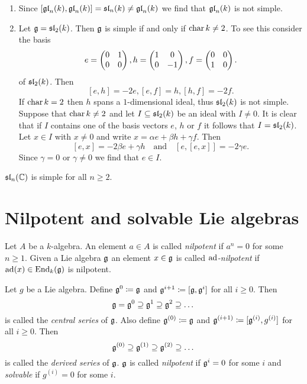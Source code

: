 \begin{expls}
 \begin{enumerate}
  \item
   Since $[\mathfrak{gl}_n(k),\mathfrak{gl}_n(k)] = \mathfrak{sl}_n(k) \neq \mathfrak{gl}_n(k)$ we find that $\mathfrak{gl}_n(k)$ is not simple.
  \item
   Let $\mathfrak{g} = \mathfrak{sl}_2(k)$. Then $\mathfrak{g}$ is simple if and only if $\operatorname{char} k \neq 2$. To see this consider the basis
   \[
    e = \begin{pmatrix}0 & 1 \\ 0 & 0\end{pmatrix}, h = \begin{pmatrix}1 & 0 \\ 0 & -1\end{pmatrix}, f = \begin{pmatrix}0 & 0 \\ 1 & 0\end{pmatrix}.
   \]
   of $\mathfrak{sl}_2(k)$. Then
   \[
    [e,h] = -2e, [e,f] = h, [h,f] = -2f.
   \]
   If $\operatorname{char} k = 2$ then $h$ spans a $1$-dimensional ideal, thus $\mathfrak{sl}_2(k)$ is not simple. Suppose that $\operatorname{char} k \neq 2$ and let $I \subseteq \mathfrak{sl}_2(k)$ be an ideal with $I \neq 0$. It is clear that if $I$ contains one of the basis vectors $e$, $h$ or $f$ it follows that $I = \mathfrak{sl}_2(k)$. Let $x \in I$ with $x \neq 0$ and write $x = \alpha e + \beta h + \gamma f$. Then
   \[
    [e,x] = -2 \beta e + \gamma h \quad \text{and} \quad [e,[e,x]] = -2 \gamma e.
   \]
   Since $\gamma = 0$ or $\gamma \neq 0$ we find that $e \in I$.
 \end{enumerate}
\end{expls}


\begin{rem}
 $\mathfrak{sl}_n(\mathbb{C})$ is simple for all $n \geq 2$.
\end{rem}





\section{Nilpotent and solvable Lie algebras}

\begin{defi}
 Let $A$ be a $k$-algebra. An element $a \in A$ is called \emph{nilpotent} if $a^n = 0$ for some $n \geq 1$. Given a Lie algebra $\mathfrak{g}$ an element $x \in \mathfrak{g}$ is called \emph{$\operatorname{ad}$-nilpotent} if $\operatorname{ad}(x) \in \operatorname{End}_k(\mathfrak{g})$ is nilpotent.
\end{defi}


\begin{defi}
 Let $g$ be a Lie algebra. Define $\mathfrak{g}^0 \coloneqq \mathfrak{g}$ and $\mathfrak{g}^{i+1} \coloneqq [\mathfrak{g},\mathfrak{g}^i]$ for all $i \geq 0$. Then
 \[
  \mathfrak{g} = \mathfrak{g}^0 \supseteq \mathfrak{g}^1 \supseteq \mathfrak{g}^2 \supseteq \dots
 \]
 is called the \emph{central series} of $\mathfrak{g}$. Also define $\mathfrak{g}^{(0)} \coloneqq \mathfrak{g}$ and $\mathfrak{g}^{(i+1)} \coloneqq [\mathfrak{g}^{(i)},g^{(i)}]$ for all $i \geq 0$. Then
 \[
  \mathfrak{g}^{(0)} \supseteq \mathfrak{g}^{(1)} \supseteq \mathfrak{g}^{(2)} \supseteq \dots
 \]
 is called the \emph{derived series} of $\mathfrak{g}$. $\mathfrak{g}$ is called \emph{nilpotent} if $\mathfrak{g}^i = 0$ for some $i$ and \emph{solvable} if $g^{(i)} = 0$ for some $i$.
\end{defi}



